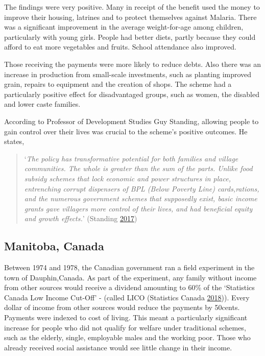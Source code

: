 \documentclass[]{tufte-handout}
\begin{document}
The findings were very positive. Many in receipt of the benefit used the
money to improve their housing, latrines and to protect themselves
against Malaria. There was a significant improvement in the average
weight-for-age among children, particularly with young girls. People had
better diets, partly because they could afford to eat more vegetables
and fruits. School attendance also improved.

Those receiving the payments were more likely to reduce debts. Also
there was an increase in production from small-scale investments, such
as planting improved grain, repairs to equipment and the creation of
shops. The scheme had a particularly positive effect for disadvantaged
groups, such as women, the disabled and lower caste families.

According to Professor of Development Studies Guy Standing, allowing
people to gain control over their lives was crucial to the scheme's
positive outcomes. He states,

\begin{quote}
`\emph{The policy has transformative potential for both families and
village communities. The whole is greater than the sum of the parts.
Unlike food subsidy schemes that lock economic and power structures in
place, entrenching corrupt dispensers of BPL (Below Poverty Line)
cards,rations, and the numerous government schemes that supposedly
exist, basic income grants gave villagers more control of their lives,
and had beneficial equity and growth effects.}' (Standing
\protect\hyperlink{ref-Standing2017}{2017})
\end{quote}

\hypertarget{manitoba-canada}{%
\subsection{Manitoba, Canada}\label{manitoba-canada}}

Between 1974 and 1978, the Canadian government ran a field experiment in
the town of Dauphin,Canada. As part of the experiment, any family
without income from other sources would receive a dividend amounting to
60\% of the `Statistics Canada Low Income Cut-Off' - (called LICO
(Statistics Canada \protect\hyperlink{ref-StatisticsCanada2018}{2018})).
Every dollar of income from other sources would reduce the payments by
50cents. Payments were indexed to cost of living. This meant a
particularly significant increase for people who did not qualify for
welfare under traditional schemes, such as the elderly, single,
employable males and the working poor. Those who already received social
assistance would see little change in their income.
\end{document}
